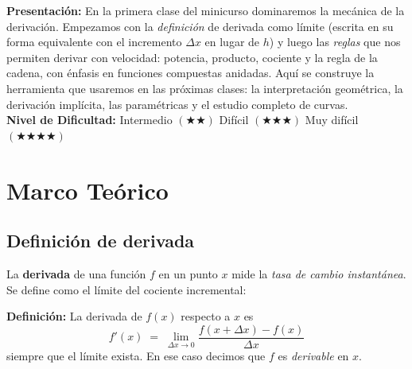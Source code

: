 \documentclass[12pt, letterpaper]{article}
\begin{document}


\vspace{4pt}
\begin{cuadroinfo}
  \small
  \textbf{Presentación:} En la primera clase del minicurso dominaremos la mecánica de la derivación. Empezamos con la \emph{definición} de derivada como límite (escrita en su forma equivalente con el incremento $\Delta x$ en lugar de $h$) y luego las \emph{reglas} que nos permiten derivar con velocidad: potencia, producto, cociente y la regla de la cadena, con énfasis en funciones compuestas anidadas. Aquí se construye la herramienta que usaremos en las próximas clases: la interpretación geométrica, la derivación implícita, las paramétricas y el estudio completo de curvas.
  \\[6pt]
  \textbf{Nivel de Dificultad:}\quad
  \medio{} Intermedio $(\bigstar\bigstar)$ \quad
  \dificil{} Difícil $(\bigstar\bigstar\bigstar)$ \quad
  \muyDificil{} Muy difícil $(\bigstar\bigstar\bigstar\bigstar)$
\end{cuadroinfo}

\vspace{8pt}

\section{Marco Teórico}

\subsection{Definición de derivada}

La \textbf{derivada} de una función $f$ en un punto $x$ mide la \emph{tasa de cambio instantánea}. Se define como el límite del cociente incremental:

\begin{cuadroteoria}
  \textbf{Definición:} La derivada de $f(x)$ respecto a $x$ es
  \[
    f'(x) \;=\; \lim_{\Delta x \to 0} \frac{f(x+\Delta x) - f(x)}{\Delta x}
  \]
  siempre que el límite exista. En ese caso decimos que $f$ es \emph{derivable} en $x$.
\end{cuadroteoria}
\end{document}
